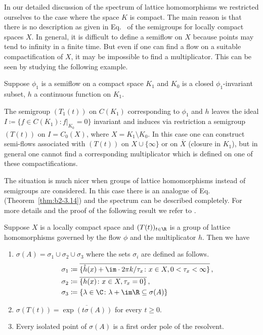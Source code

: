 	In our detailed discussion of the spectrum of lattice homomorphisms we restricted ourselves to the case where the space $K$ is compact.
	The main reason is that there is no description as given in Eq.~ of the semigroups for locally compact spaces $X$.
	In general, it is difficult to define a semiflow on $X$ because points may tend to infinity in a finite time.
	But even if one can find a flow on a suitable compactification of\/ $X$, it may be impossible to find a multiplicator.
	This can be seen by studying the following example.
	
	Suppose $\phi_{1}$ is a semiflow on a compact space $K_{1}$ and $K_{0}$ is a closed $\phi_{1}$-invariant subset, $h$ a continuous function on $K_{1}$.

    The semigroup $(T_{1}(t))$ on $C(K_{1})$ corresponding to $\phi_{1}$ and $h$ leaves the ideal $I \coloneq \{f \in C(K_{1}) \colon f|_{K_{0}} = 0\}$ invariant and induces via restriction a semigroup $(T(t))$ on $I = C_{0}(X)$, where $X = K_{1} \setminus K_{0}$.
    In this case one can construct semi-flows associated with $(T(t))$ on $X\cup\{\infty\}$ or on $\overline{X}$ (closure in $K_{1}$), but in general one cannot find a corresponding multiplicator which is defined on one of these compactifications.

The situation is much nicer when groups of lattice homomorphisms instead of semigroups are considered.
In this case there is an analogue of Eq.~ (\cf Theorem~\ref{thm:b2-3.14}) and the spectrum can be described completely.
For more details and the proof of the following result we refer to \textcite{arendtgreiner:1984}.
\begin{theorem}\label{thm:b3-4.11}
	Suppose $X$ is a locally compact space and $(T(t))_{t\in\R}$ is a group of lattice homomorphisms
    governed by the flow $\phi$ and the multiplicator $h$.
	Then we have
	\begin{enumerate}[\upshape (i)]
		\item 
		$\sigma(A) = \sigma_{1}\cup\sigma_{2}\cup\sigma_{3}$ where the sets $\sigma_{i}$ are defined as follows.
		\[\begin{aligned}
			\sigma_{1} &\coloneq \overline{\{\hat{h}(x) + \im\cdot 2\pi k/\tau_{x} \colon x \in X, 0 < \tau_{x} < \infty\}}\,,\\
			\sigma_{2} &\coloneq \overline{\{h(x) \colon x \in X, \tau_{x} = 0\}}\,, \\
			\sigma_{3} &\coloneq \{\lambda \in \C \colon \lambda + \im\R \subseteq \sigma(A)\}
		\end{aligned}\]
		
		\item 
		$\sigma(T(t)) = \overline{\exp(t\sigma(A))}$ for every $t \geq 0$.
		
		\item 
		Every isolated point of\/ $\sigma(A)$ is a first order pole of the resolvent.
	\end{enumerate}
\end{theorem}
